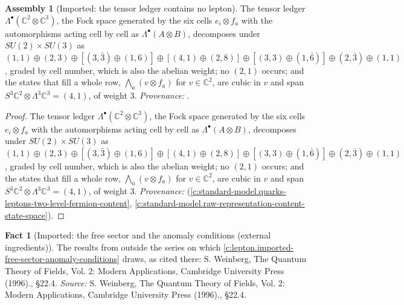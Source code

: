 \documentclass[11pt]{article}
\theoremstyle{definition}
\newtheorem{fact}[theorem]{Fact}
\newtheorem{assembled}[theorem]{Assembly}
\theoremstyle{plain}
\providecommand{\C}{}\renewcommand{\C}{\mathbb{C}}
\begin{document}
\begin{assembled}[Imported: the tensor ledger contains no lepton]\label{c:lepton.imported-tensor-ledger-contains-no-lepton}
The tensor ledger $\Lambda^{\bullet}(\C^{2} \otimes \C^{3})$, the Fock space generated by the six cells $e_{i} \otimes f_{a}$ with the automorphisms acting cell by cell as $\Lambda^{\bullet}(A \otimes B)$, decomposes under $SU(2) \times SU(3)$ as $(1,1) \oplus (2,3) \oplus [(3,\bar{3}) \oplus (1,6)] \oplus [(4,1) \oplus (2,8)] \oplus [(3,3) \oplus (1,\bar{6})] \oplus (2,\bar{3}) \oplus (1,1)$, graded by cell number, which is also the abelian weight; no $(2,1)$ occurs; and the states that fill a whole row, $\bigwedge_{a}(v \otimes f_{a})$ for $v \in \C^{2}$, are cubic in $v$ and span $S^{3}\C^{2} \otimes \Lambda^{3}\C^{3} = (4,1)$, of weight $3$. \emph{Provenance:} \cite[Prop.~5.1 and Prop.~5.3(2)]{ButlerT12}.
\end{assembled}
\begin{proof}
The tensor ledger $\Lambda^{\bullet}(\C^{2} \otimes \C^{3})$, the Fock space generated by the six cells $e_{i} \otimes f_{a}$ with the automorphisms acting cell by cell as $\Lambda^{\bullet}(A \otimes B)$, decomposes under $SU(2) \times SU(3)$ as $(1,1) \oplus (2,3) \oplus [(3,\bar{3}) \oplus (1,6)] \oplus [(4,1) \oplus (2,8)] \oplus [(3,3) \oplus (1,\bar{6})] \oplus (2,\bar{3}) \oplus (1,1)$, graded by cell number, which is also the abelian weight; no $(2,1)$ occurs; and the states that fill a whole row, $\bigwedge_{a}(v \otimes f_{a})$ for $v \in \C^{2}$, are cubic in $v$ and span $S^{3}\C^{2} \otimes \Lambda^{3}\C^{3} = (4,1)$, of weight $3$. \emph{Provenance:} \cite[Prop.~5.1 and Prop.~5.3(2)]{ButlerT12} (\ref{c:standard-model.quarks-leptons-two-level-fermion-content}, \ref{c:standard-model.raw-representation-content-state-space}).

\end{proof}

\begin{fact}[Imported: the free sector and the anomaly conditions (external ingredients)]\label{c:lepton.imported-free-sector-anomaly-conditions-external}
The results from outside the series on which \ref{c:lepton.imported-free-sector-anomaly-conditions} draws, as cited there: S. Weinberg, The Quantum Theory of Fields, Vol. 2: Modern Applications, Cambridge University Press (1996)., \S 22.4.
\emph{Source:} S. Weinberg, The Quantum Theory of Fields, Vol. 2: Modern Applications, Cambridge University Press (1996)., \S 22.4.
\end{fact}
\end{document}
